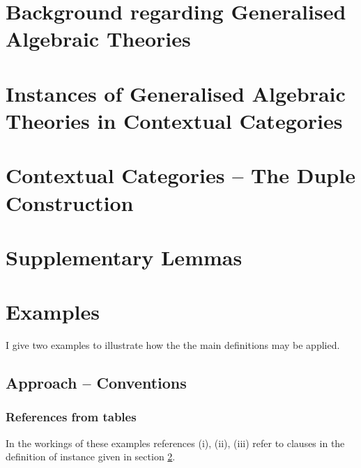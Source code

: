 \documentclass[10pt,a4paper]{article}
\theoremstyle{remark}
\begin{document}
\section{Background regarding Generalised Algebraic Theories}

\iffalse
\section{Contextual Categories }

\section{Meta-GAT algebras}

\fi                         %
\section{Instances of Generalised Algebraic Theories in Contextual Categories}
\label{sectioninwhichinstanceisdefined}


\iffalse

\section{Contextual Categories -- The Duple Construction}
\label{contextualnotationparttwo}


\section{Supplementary Lemmas}

\section{Examples}
\label{examples}
I give two examples to illustrate how the the main definitions may be applied. 
\subsection{Approach -- Conventions}


\subsubsection{References from tables}

In the workings of these examples references (i), (ii), (iii)  refer to clauses in the  definition of instance given in 
section \ref{sectioninwhichinstanceisdefined}.
\end{document}
